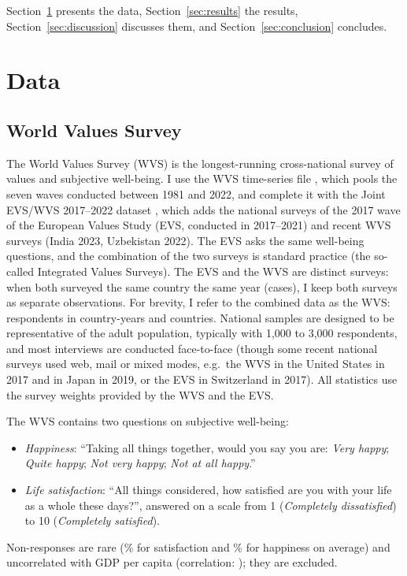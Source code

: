 \documentclass[12pt]{article}
\begin{document}
Section~\ref{sec:data} presents the data, Section~\ref{sec:results} the results, Section~\ref{sec:discussion} discusses them, and Section~\ref{sec:conclusion} concludes.

\section{Data}\label{sec:data}
\subsection{World Values Survey}\label{subsec:wvs}

The World Values Survey (WVS) is the longest-running cross-national survey of values and subjective well-being. I use the WVS time-series file \citep{wvs_trend_2022}, which pools the seven waves conducted between 1981 and 2022, and complete it with the Joint EVS/WVS 2017--2022 dataset \citep{evs_wvs_joint_2024}, which adds the \nEVSSurveys national surveys of the 2017 wave of the European Values Study (EVS, conducted in 2017--2021) and \nNewWVSSurveys recent WVS surveys (India 2023, Uzbekistan 2022). The EVS asks the same well-being questions, and the combination of the two surveys is standard practice (the so-called Integrated Values Surveys). The EVS and the WVS are distinct surveys: when both surveyed the same country the same year (\nEVSSameYearWVS cases), I keep both surveys as separate observations.
For brevity, I refer to the combined data as the WVS: \nWVSRespondents respondents in \nWVSCountryYears country-years and \nWVSCountries countries. National samples are designed to be representative of the adult population, typically with 1,000 to 3,000 respondents, and most interviews are conducted face-to-face (though some recent national surveys used web, mail or mixed modes, e.g.\ the WVS in the United States in 2017 and in Japan in 2019, or the EVS in Switzerland in 2017). All statistics use the survey weights provided by the WVS and the EVS.

The WVS contains two questions on subjective well-being:
\begin{itemize}
    \item \textit{Happiness}: ``Taking all things together, would you say you are: \textit{Very happy}; \textit{Quite happy}; \textit{Not very happy}; \textit{Not at all happy}.''
    \item \textit{Life satisfaction}: ``All things considered, how satisfied are you with your life as a whole these days?'', answered on a scale from 1 (\textit{Completely dissatisfied}) to 10 (\textit{Completely satisfied}).
\end{itemize}
Non-responses are rare (\nonresponseSatisfactionWVS\% for satisfaction and \nonresponseHappinessWVS\% for happiness on average) and uncorrelated with GDP per capita (correlation: \corNonresponseGDP); they are excluded.
\end{document}

